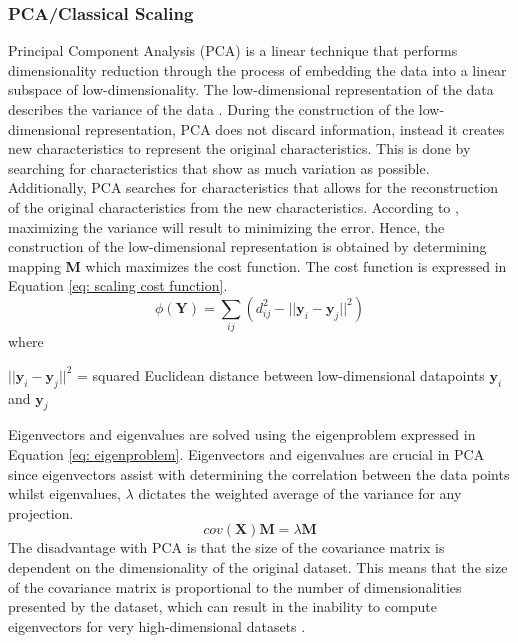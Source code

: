 \documentclass[11pt,twocolumn]{witseiepaper}
\begin{document}
	\subsubsection{PCA/Classical Scaling}
	Principal Component Analysis (PCA) is a linear technique that performs dimensionality reduction through the process of embedding the data into a linear subspace of low-dimensionality. The low-dimensional representation of the data describes the variance of the data \cite{Jolliffe2016}. During the construction of the low-dimensional representation, PCA does not discard information, instead it creates new characteristics to represent the original characteristics. This is done by searching for characteristics that show as much variation as possible. Additionally, PCA searches for characteristics that allows for the reconstruction of the original characteristics from the new characteristics. According to \cite{van2009dimensionality}, maximizing the variance will result to minimizing the error. Hence, the construction of the low-dimensional representation is obtained by determining mapping  \textbf{M} which maximizes the cost function. The cost function is expressed in Equation \ref{eq: scaling cost function}.
	\begin{equation}
	\phi(\textbf{Y}) = \sum_{ij}(d_{ij}^{2} - ||\textbf{y}_i - \textbf{y}_j||^2)
	\label{eq: scaling cost function}
	\end{equation}
	where 
	
	$||\textbf{y}_i - \textbf{y}_j ||^{2}$ = squared Euclidean distance between low-dimensional datapoints $\textbf{y}_i$ and $\textbf{y}_j$
	
	Eigenvectors and eigenvalues are solved using the eigenproblem expressed in Equation \ref{eq: eigenproblem}. Eigenvectors and eigenvalues are crucial in PCA since eigenvectors assist with determining the correlation between the data points whilst eigenvalues, $\lambda$ dictates the weighted average of the variance for any projection.
	\begin{equation}
	cov(\textbf{X})\textbf{M} = \lambda\textbf{M}
	\label{eq: eigenproblem}
	\end{equation}
	The disadvantage with PCA is that the size of the covariance matrix is dependent on the dimensionality of the original dataset. This means that the size of the covariance matrix is proportional to the number of dimensionalities presented by the dataset, which can result in the inability to compute eigenvectors for very high-dimensional datasets \cite{van2009dimensionality}.
	
\end{document}
